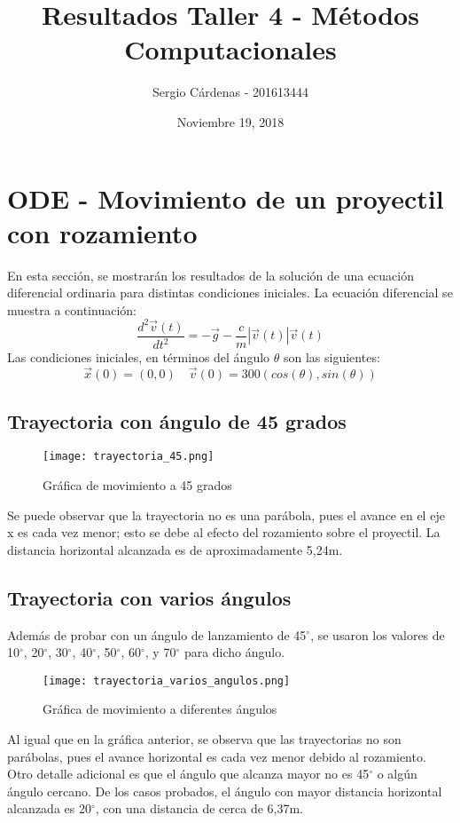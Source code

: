 \documentclass{article}
\title{Resultados Taller 4 - Métodos Computacionales}
\author{Sergio Cárdenas - 201613444}
\date{Noviembre 19, 2018}
\begin{document}
\maketitle
\section{ODE - Movimiento de un proyectil con rozamiento}
En esta sección, se mostrarán los resultados de la solución de una ecuación diferencial ordinaria para distintas condiciones iniciales. La ecuación diferencial se muestra a continuación:
\begin{equation}
    \frac{d^{2}\vec{v}(t)}{dt^{2}}=-\vec{g}-\frac{c}{m}|\vec{v}(t)|\vec{v}(t)
\end{equation}
Las condiciones iniciales, en términos del ángulo $\theta$ son las siguientes:
\begin{equation}
    \vec{x}(0)=(0,0) \quad \vec{v}(0)=300(cos(\theta),sin(\theta))
\end{equation}
\subsection*{Trayectoria con ángulo de 45 grados}

\begin{figure}[H]
    \centering
    \texttt{[image: trayectoria\_45.png]}
    \caption{Gráfica de movimiento a 45 grados}
    \label{fig:my_label}
\end{figure}

Se puede observar que la trayectoria no es una parábola, pues el avance en el eje x es cada vez menor; esto se debe al efecto del rozamiento sobre el proyectil. La distancia horizontal alcanzada es de aproximadamente 5,24m.

\subsection{Trayectoria con varios ángulos}
Además de probar con un ángulo de lanzamiento de 45$^\circ$, se usaron los valores de 10$^\circ$, 20$^\circ$, 30$^\circ$, 40$^\circ$, 50$^\circ$, 60$^\circ$, y 70$^\circ$ para dicho ángulo.
\begin{figure}[H]
    \centering
    \texttt{[image: trayectoria\_varios\_angulos.png]}
    \caption{Gráfica de movimiento a diferentes ángulos}
    \label{fig:my_label}
\end{figure}

Al igual que en la gráfica anterior, se observa que las trayectorias no son parábolas, pues el avance horizontal es cada vez menor debido al rozamiento. Otro detalle adicional es que el ángulo que alcanza mayor no es 45$^\circ$ o algún ángulo cercano. De los casos probados, el ángulo con mayor distancia horizontal alcanzada es 20$^\circ$, con una distancia de cerca de 6,37m.
\end{document}
